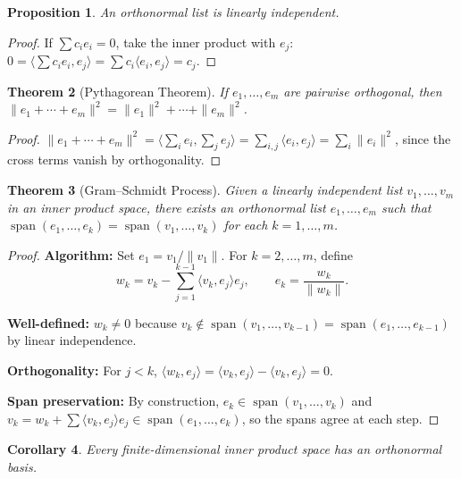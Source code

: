 \documentclass[11pt,a4paper]{article}
\theoremstyle{definition}
\theoremstyle{plain}
\newtheorem{theorem}{Theorem}[section]
\newtheorem{proposition}[theorem]{Proposition}
\newtheorem{corollary}[theorem]{Corollary}
\theoremstyle{remark}
\DeclareMathOperator{\Span}{span}
\begin{document}
\begin{proposition}
\label{prop:orthonormal_independent}
An orthonormal list is linearly independent.
\end{proposition}

\begin{proof}
If $\sum c_i e_i = 0$, take the inner product with $e_j$:
$0 = \langle \sum c_i e_i, e_j \rangle = \sum c_i \langle e_i, e_j \rangle = c_j$.
\end{proof}

\begin{theorem}[Pythagorean Theorem]
\label{thm:pythagorean}
If $e_1, \ldots, e_m$ are pairwise orthogonal, then
$\|e_1 + \cdots + e_m\|^2 = \|e_1\|^2 + \cdots + \|e_m\|^2$.
\end{theorem}

\begin{proof}
$\|e_1 + \cdots + e_m\|^2 = \langle \sum_i e_i, \sum_j e_j \rangle = \sum_{i,j}
\langle e_i, e_j \rangle = \sum_i \|e_i\|^2$, since the cross terms vanish by orthogonality.
\end{proof}

\begin{theorem}[Gram--Schmidt Process]
\label{thm:gram_schmidt}
Given a linearly independent list $v_1, \ldots, v_m$ in an inner product space, there exists
an orthonormal list $e_1, \ldots, e_m$ such that
$\Span(e_1, \ldots, e_k) = \Span(v_1, \ldots, v_k)$ for each $k = 1, \ldots, m$.
\end{theorem}

\begin{proof}
\textbf{Algorithm:} Set $e_1 = v_1 / \|v_1\|$. For $k = 2, \ldots, m$, define
\[
    w_k = v_k - \sum_{j=1}^{k-1} \langle v_k, e_j \rangle e_j, \qquad e_k = \frac{w_k}{\|w_k\|}.
\]

\textbf{Well-defined:} $w_k \neq 0$ because $v_k \notin \Span(v_1, \ldots, v_{k-1})
= \Span(e_1, \ldots, e_{k-1})$ by linear independence.

\textbf{Orthogonality:} For $j < k$,
$\langle w_k, e_j \rangle = \langle v_k, e_j \rangle - \langle v_k, e_j \rangle = 0$.

\textbf{Span preservation:} By construction, $e_k \in \Span(v_1, \ldots, v_k)$ and
$v_k = w_k + \sum \langle v_k, e_j \rangle e_j \in \Span(e_1, \ldots, e_k)$, so the
spans agree at each step.
\end{proof}

\begin{corollary}
\label{cor:onb_exists}
Every finite-dimensional inner product space has an orthonormal basis.
\end{corollary}
\end{document}
